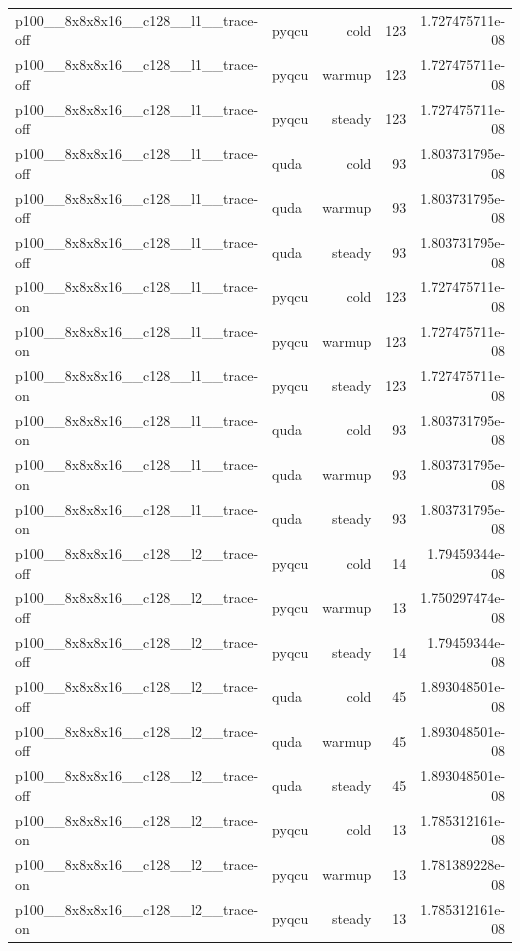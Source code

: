 \begin{table}[htbp]
\begin{tabular}{@{}llrrr@{}}
p100\_\_8x8x8x16\_\_c128\_\_l1\_\_trace-off & pyqcu & cold & 123 & 1.727475711e-08 \\
p100\_\_8x8x8x16\_\_c128\_\_l1\_\_trace-off & pyqcu & warmup & 123 & 1.727475711e-08 \\
p100\_\_8x8x8x16\_\_c128\_\_l1\_\_trace-off & pyqcu & steady & 123 & 1.727475711e-08 \\
p100\_\_8x8x8x16\_\_c128\_\_l1\_\_trace-off & quda & cold & 93 & 1.803731795e-08 \\
p100\_\_8x8x8x16\_\_c128\_\_l1\_\_trace-off & quda & warmup & 93 & 1.803731795e-08 \\
p100\_\_8x8x8x16\_\_c128\_\_l1\_\_trace-off & quda & steady & 93 & 1.803731795e-08 \\
p100\_\_8x8x8x16\_\_c128\_\_l1\_\_trace-on & pyqcu & cold & 123 & 1.727475711e-08 \\
p100\_\_8x8x8x16\_\_c128\_\_l1\_\_trace-on & pyqcu & warmup & 123 & 1.727475711e-08 \\
p100\_\_8x8x8x16\_\_c128\_\_l1\_\_trace-on & pyqcu & steady & 123 & 1.727475711e-08 \\
p100\_\_8x8x8x16\_\_c128\_\_l1\_\_trace-on & quda & cold & 93 & 1.803731795e-08 \\
p100\_\_8x8x8x16\_\_c128\_\_l1\_\_trace-on & quda & warmup & 93 & 1.803731795e-08 \\
p100\_\_8x8x8x16\_\_c128\_\_l1\_\_trace-on & quda & steady & 93 & 1.803731795e-08 \\
p100\_\_8x8x8x16\_\_c128\_\_l2\_\_trace-off & pyqcu & cold & 14 & 1.79459344e-08 \\
p100\_\_8x8x8x16\_\_c128\_\_l2\_\_trace-off & pyqcu & warmup & 13 & 1.750297474e-08 \\
p100\_\_8x8x8x16\_\_c128\_\_l2\_\_trace-off & pyqcu & steady & 14 & 1.79459344e-08 \\
p100\_\_8x8x8x16\_\_c128\_\_l2\_\_trace-off & quda & cold & 45 & 1.893048501e-08 \\
p100\_\_8x8x8x16\_\_c128\_\_l2\_\_trace-off & quda & warmup & 45 & 1.893048501e-08 \\
p100\_\_8x8x8x16\_\_c128\_\_l2\_\_trace-off & quda & steady & 45 & 1.893048501e-08 \\
p100\_\_8x8x8x16\_\_c128\_\_l2\_\_trace-on & pyqcu & cold & 13 & 1.785312161e-08 \\
p100\_\_8x8x8x16\_\_c128\_\_l2\_\_trace-on & pyqcu & warmup & 13 & 1.781389228e-08 \\
p100\_\_8x8x8x16\_\_c128\_\_l2\_\_trace-on & pyqcu & steady & 13 & 1.785312161e-08 \\

\end{tabular}
\end{table}

